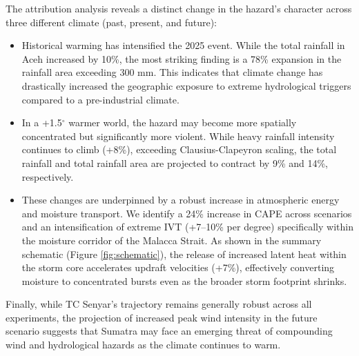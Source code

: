 The attribution analysis reveals a distinct change in the hazard's character across three different climate (past, present, and future):
\begin{itemize}
    \item Historical warming has intensified the 2025 event. While the total rainfall in Aceh increased by 10\%, the most striking finding is a 78\% expansion in the rainfall area exceeding 300 mm. This indicates that climate change has drastically increased the geographic exposure to extreme hydrological triggers compared to a pre-industrial climate.
    \item In a +1.5$^\circ$ warmer world, the hazard may become more spatially concentrated but significantly more violent. While heavy rainfall intensity continues to climb (+8\%), exceeding Clausius-Clapeyron scaling, the total rainfall and total rainfall area are projected to contract by 9\% and 14\%, respectively.
    \item These changes are underpinned by a robust increase in atmospheric energy and moisture transport. We identify a 24\% increase in CAPE across scenarios and an intensification of extreme IVT (+7–10\% per degree) specifically within the moisture corridor of the Malacca Strait. As shown in the summary schematic (Figure \ref{fig:schematic}), the release of increased latent heat within the storm core accelerates updraft velocities (+7\%), effectively converting moisture to concentrated bursts even as the broader storm footprint shrinks.
\end{itemize}

Finally, while TC Senyar’s trajectory remains generally robust across all experiments, the projection of increased peak wind intensity in the future scenario suggests that Sumatra may face an emerging threat of compounding wind and hydrological hazards as the climate continues to warm.

